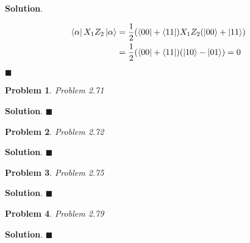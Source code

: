 \documentclass[12pt]{article}
\newtheorem{p}{Problem}
\theoremstyle{definition}
\newenvironment{s}{%
        \begin{trivlist} \item \textbf{Solution}. }{%
            \hspace*{\fill} $\blacksquare$\end{trivlist}}%
\begin{document}
{\begin{s}

\begin{align*}
\bra{\alpha}X_{1}Z_{2}\ket{\alpha} &= \frac{1}{2}(\bra{00}+\bra{11}) X_{1}Z_{2} (\ket{00} + \ket{11})\\
&= \frac{1}{2}(\bra{00}+\bra{11})(\ket{10} - \ket{01}) = 0
\end{align*}

\end{s}

\begin{p}
Problem 2.71
\end{p}

\begin{s}
\end{s}

\begin{p}
Problem 2.72
\end{p}

\begin{s}
\end{s}

\begin{p}
Problem 2.75
\end{p}

\begin{s}
\end{s}

\begin{p}
Problem 2.79
\end{p}

\begin{s}
\end{s}
\end{document}
